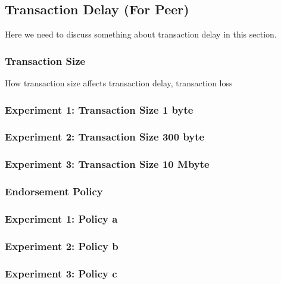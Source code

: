 \documentclass[10pt,journal,compsoc, twoside]{IEEEtran}
\begin{document}
\subsection{Transaction Delay (For Peer)}
 
Here we need to discuss something about transaction delay in this section. 


\subsubsection{Transaction Size}

How transaction size affects transaction delay, transaction loss

\subsubsection{Experiment 1: Transaction Size 1 byte}



\subsubsection{Experiment 2: Transaction Size 300 byte}



\subsubsection{Experiment 3: Transaction Size 10 Mbyte}








\subsubsection{Endorsement Policy} 

\subsubsection{Experiment 1: Policy a}


\subsubsection{Experiment 2: Policy b}


\subsubsection{Experiment 3: Policy c}
\end{document}

